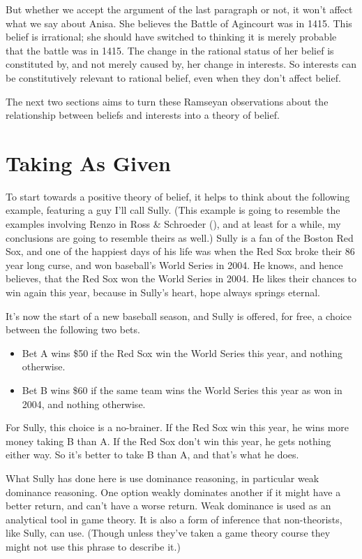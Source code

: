 \documentclass[
  10pt,
  letterpaper,
  twoside]{scrbook}
\providecommand{\tightlist}{%
  \setlength{\itemsep}{0pt}\setlength{\parskip}{0pt}}\usepackage{longtable,booktabs,array}
\begin{document}
But whether we accept the argument of the last paragraph or not, it
won't affect what we say about Anisa. She believes the Battle of
Agincourt was in 1415. This belief is irrational; she should have
switched to thinking it is merely probable that the battle was in 1415.
The change in the rational status of her belief is constituted by, and
not merely caused by, her change in interests. So interests can be
constitutively relevant to rational belief, even when they don't affect
belief.

The next two sections aims to turn these Ramseyan observations about the
relationship between beliefs and interests into a theory of belief.

\section{Taking As Given}\label{sec-given}

To start towards a positive theory of belief, it helps to think about
the following example, featuring a guy I'll call Sully. (This example is
going to resemble the examples involving Renzo in Ross \& Schroeder
(), and at least for a while, my
conclusions are going to resemble theirs as well.) Sully is a fan of the
Boston Red Sox, and one of the happiest days of his life was when the
Red Sox broke their 86 year long curse, and won baseball's World Series
in 2004. He knows, and hence believes, that the Red Sox won the World
Series in 2004. He likes their chances to win again this year, because
in Sully's heart, hope always springs eternal.

It's now the start of a new baseball season, and Sully is offered, for
free, a choice between the following two bets.

\begin{itemize}
\tightlist
\item
  Bet A wins \$50 if the Red Sox win the World Series this year, and
  nothing otherwise.
\item
  Bet B wins \$60 if the same team wins the World Series this year as
  won in 2004, and nothing otherwise.
\end{itemize}

For Sully, this choice is a no-brainer. If the Red Sox win this year, he
wins more money taking B than A. If the Red Sox don't win this year, he
gets nothing either way. So it's better to take B than A, and that's
what he does.

What Sully has done here is use dominance reasoning, in particular weak
dominance reasoning. One option weakly dominates another if it might
have a better return, and can't have a worse return. Weak dominance is
used as an analytical tool in game theory. It is also a form of
inference that non-theorists, like Sully, can use. (Though unless
they've taken a game theory course they might not use this phrase to
describe it.)
\end{document}
